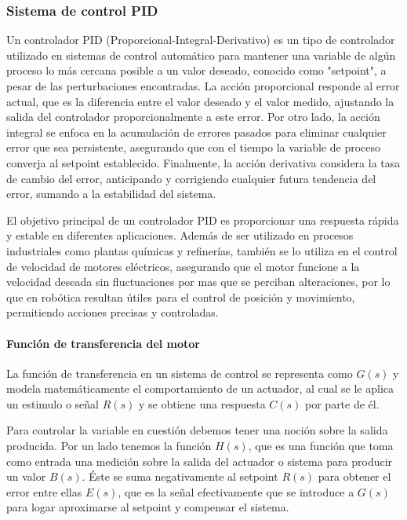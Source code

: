 \subsubsection{Sistema de control PID}
Un controlador PID (Proporcional-Integral-Derivativo) es un tipo de controlador utilizado en sistemas de control automático para mantener una variable de algún proceso lo más cercana posible a un valor deseado, conocido como "setpoint", a pesar de las perturbaciones encontradas. La acción proporcional responde al error actual, que es la diferencia entre el valor deseado y el valor medido, ajustando la salida del controlador proporcionalmente a este error. Por otro lado, la acción integral se enfoca en la acumulación de errores pasados para eliminar cualquier error que sea persistente, asegurando que con el tiempo la variable de proceso converja al setpoint establecido. Finalmente, la acción derivativa considera la tasa de cambio del error, anticipando y corrigiendo cualquier futura tendencia del error, sumando a la estabilidad del sistema.

El objetivo principal de un controlador PID es proporcionar una respuesta rápida y estable en diferentes aplicaciones. Además de ser utilizado en procesos industriales como plantas químicas y refinerías, también se lo utiliza en el control de velocidad de motores eléctricos, asegurando que el motor funcione a la velocidad deseada sin fluctuaciones por mas que se perciban alteraciones, por lo que en robótica resultan útiles para el control de posición y movimiento, permitiendo acciones precisas y controladas. \cite{ogatacontrol}

\paragraph{Función de transferencia del motor} \mbox{} \vspace{8pt}

La función de transferencia en un sistema de control se representa como $G(s)$ y modela matemáticamente el comportamiento de un actuador, al cual se le aplica un estimulo o señal $R(s)$ y se obtiene una respuesta $C(s)$ por parte de él.

Para controlar la variable en cuestión debemos tener una noción sobre la salida producida. Por un lado tenemos la función $H(s)$, que es una función que toma como entrada una medición sobre la salida del actuador o sistema para producir un valor $B(s)$. Éste se suma negativamente al setpoint $R(s)$ para obtener el error entre ellas $E(s)$, que es la señal efectivamente que se introduce a $G(s)$ para logar aproximarse al setpoint y compensar el sistema.


